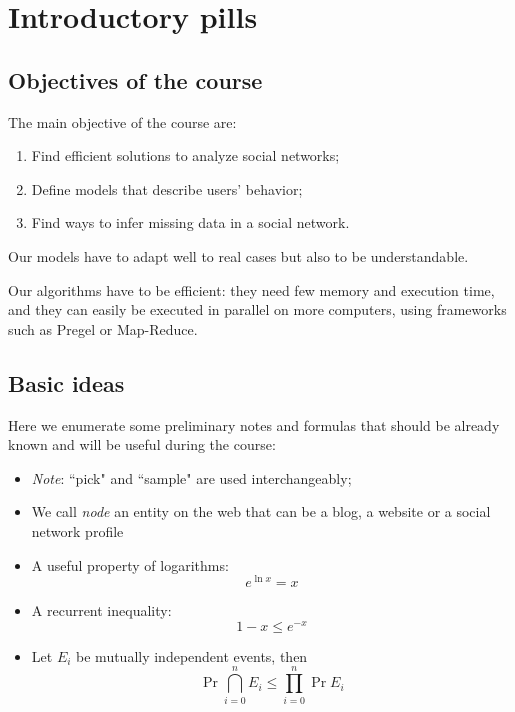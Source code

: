 
\chapter{Introductory pills}

\section{Objectives of the course}
    
    The main objective of the course are:
    \begin{enumerate}
        \item Find efficient solutions to analyze social networks;
        \item Define models that describe users' behavior;
        \item Find ways to infer missing data in a social network.
    \end{enumerate}

    Our models have to adapt well to real cases but also to be understandable.
    
    Our algorithms have to be efficient: they need few memory and execution time, and they can easily be executed in parallel on more computers, using frameworks such as Pregel or Map-Reduce.


\section{Basic ideas}

    Here we enumerate some preliminary notes and formulas that should be already known and will be useful during the course:
    
    \begin{itemize}
        \item \textit{Note}: ``pick" and ``sample" are used interchangeably;
        \item We call \emph{node} an entity on the web that can be a blog, a website or a social network profile
        \item A useful property of logarithms:
            \begin{equation}\label{eq:log-prop}
                e^{\ln x} = x
            \end{equation}
        \item A recurrent inequality:
            \begin{equation}\label{eq:e-x}
                1-x \leq e^{-x}
            \end{equation}
        \item Let $E_i$ be mutually independent events, then
            \begin{equation}\label{eq:prob}
                \Pr{\bigcap_{i=0}^n E_i} \leq \prod_{i=0}^{n}\Pr{E_i}
            \end{equation}
    \end{itemize}
    
